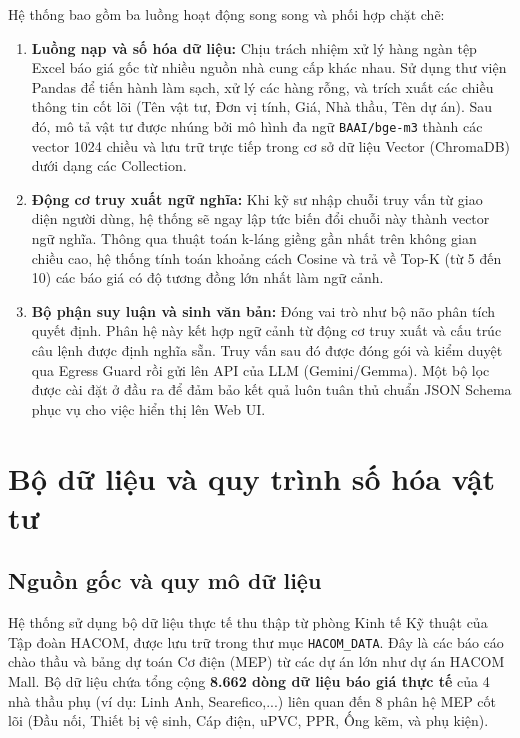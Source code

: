 Hệ thống bao gồm ba luồng hoạt động song song và phối hợp chặt chẽ:
\begin{enumerate}
    \item \textbf{Luồng nạp và số hóa dữ liệu:} 
    Chịu trách nhiệm xử lý hàng ngàn tệp Excel báo giá gốc từ nhiều nguồn nhà cung cấp khác nhau. Sử dụng thư viện Pandas để tiến hành làm sạch, xử lý các hàng rỗng, và trích xuất các chiều thông tin cốt lõi (Tên vật tư, Đơn vị tính, Giá, Nhà thầu, Tên dự án). Sau đó, mô tả vật tư được nhúng bởi mô hình đa ngữ \texttt{BAAI/bge-m3} thành các vector 1024 chiều và lưu trữ trực tiếp trong cơ sở dữ liệu Vector (ChromaDB) dưới dạng các Collection.
    \item \textbf{Động cơ truy xuất ngữ nghĩa:} 
    Khi kỹ sư nhập chuỗi truy vấn từ giao diện người dùng, hệ thống sẽ ngay lập tức biến đổi chuỗi này thành vector ngữ nghĩa. Thông qua thuật toán k-láng giềng gần nhất trên không gian chiều cao, hệ thống tính toán khoảng cách Cosine và trả về Top-K (từ 5 đến 10) các báo giá có độ tương đồng lớn nhất làm ngữ cảnh.
    \item \textbf{Bộ phận suy luận và sinh văn bản:} 
    Đóng vai trò như bộ não phân tích quyết định. Phân hệ này kết hợp ngữ cảnh từ động cơ truy xuất và cấu trúc câu lệnh được định nghĩa sẵn. Truy vấn sau đó được đóng gói và kiểm duyệt qua Egress Guard rồi gửi lên API của LLM (Gemini/Gemma). Một bộ lọc được cài đặt ở đầu ra để đảm bảo kết quả luôn tuân thủ chuẩn JSON Schema phục vụ cho việc hiển thị lên Web UI.
\end{enumerate}

\section{Bộ dữ liệu và quy trình số hóa vật tư}

\subsection{Nguồn gốc và quy mô dữ liệu}
Hệ thống sử dụng bộ dữ liệu thực tế thu thập từ phòng Kinh tế Kỹ thuật của Tập đoàn HACOM, được lưu trữ trong thư mục \texttt{HACOM\_DATA}. Đây là các báo cáo chào thầu và bảng dự toán Cơ điện (MEP) từ các dự án lớn như dự án HACOM Mall. Bộ dữ liệu chứa tổng cộng \textbf{8.662 dòng dữ liệu báo giá thực tế} của 4 nhà thầu phụ (ví dụ: Linh Anh, Searefico,...) liên quan đến 8 phân hệ MEP cốt lõi (Đầu nối, Thiết bị vệ sinh, Cáp điện, uPVC, PPR, Ống kẽm, và phụ kiện).

